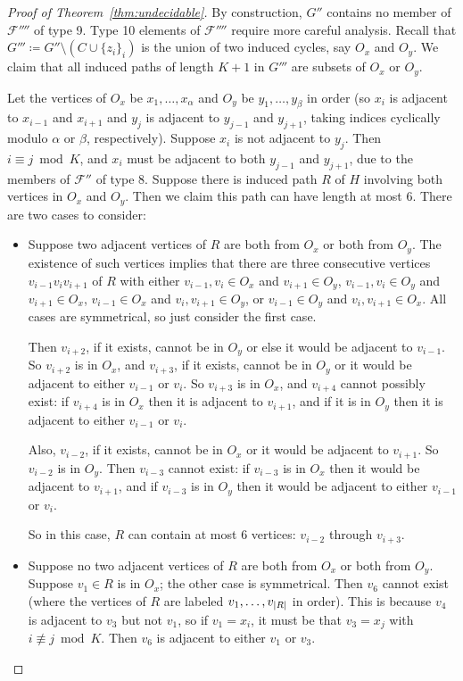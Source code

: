 \documentclass{article}
\newcommand{\Fc}{\mathcal{F}}
\DeclarePairedDelimiter{\abs}{\lvert}{\rvert}
\begin{document}
\begin{proof}[Proof of Theorem~\ref{thm:undecidable}]
By construction, $G''$ contains no member of $\Fc''''$ of type 9. Type 10 elements of $\Fc''''$ require more careful analysis. Recall that $G'''\coloneq G''\setminus(C\cup\{z_i\}_i)$ is the union of two induced cycles, say $O_x$ and $O_y$. We claim that all induced paths of length $K+1$ in $G'''$ are subsets of $O_x$ or $O_y$.

Let the vertices of $O_x$ be $x_1,\dots, x_\alpha$ and $O_y$ be $y_1,\dots, y_\beta$ in order (so $x_i$ is adjacent to $x_{i-1}$ and $x_{i+1}$ and $y_j$ is adjacent to $y_{j-1}$ and $y_{j+1}$, taking indices cyclically modulo $\alpha$ or $\beta$, respectively). Suppose $x_i$ is not adjacent to $y_j$. Then $i\equiv j\bmod K$, and $x_i$ must be adjacent to both $y_{j-1}$ and $y_{j+1}$, due to the members of $\Fc''$ of type 8. Suppose there is induced path $R$ of $H$ involving both vertices in $O_x$ and $O_y$. Then we claim this path can have length at most 6. There are two cases to consider:
\begin{itemize}
    \item Suppose two adjacent vertices of $R$ are both from $O_x$ or both from $O_y$. The existence of such vertices implies that there are three consecutive vertices $v_{i-1}v_iv_{i+1}$ of $R$ with either $v_{i-1},v_i\in O_x$ and $v_{i+1}\in O_y$, $v_{i-1},v_i\in O_y$ and $v_{i+1}\in O_x$, $v_{i-1}\in O_x$ and $v_i,v_{i+1}\in O_y$, or $v_{i-1}\in O_y$ and $v_i,v_{i+1}\in O_x$. All cases are symmetrical, so just consider the first case.
    
    Then $v_{i+2}$, if it exists, cannot be in $O_y$ or else it would be adjacent to $v_{i-1}$. So $v_{i+2}$ is in $O_x$, and $v_{i+3}$, if it exists, cannot be in $O_y$ or it would be adjacent to either $v_{i-1}$ or $v_i$. So $v_{i+3}$ is in $O_x$, and $v_{i+4}$ cannot possibly exist: if $v_{i+4}$ is in $O_x$ then it is adjacent to $v_{i+1}$, and if it is in $O_y$ then it is adjacent to either $v_{i-1}$ or $v_i$.

    Also, $v_{i-2}$, if it exists, cannot be in $O_x$ or it would be adjacent to $v_{i+1}$. So $v_{i-2}$ is in $O_y$. Then $v_{i-3}$ cannot exist: if $v_{i-3}$ is in $O_x$ then it would be adjacent to $v_{i+1}$, and if $v_{i-3}$ is in $O_y$ then it would be adjacent to either $v_{i-1}$ or $v_i$.

    So in this case, $R$ can contain at most 6 vertices: $v_{i-2}$ through $v_{i+3}$.
    \item Suppose no two adjacent vertices of $R$ are both from $O_x$ or both from $O_y$. Suppose $v_1\in R$ is in $O_x$; the other case is symmetrical. Then $v_6$ cannot exist (where the vertices of $R$ are labeled $v_1,\dots,v_{\abs{R}}$ in order). This is because $v_4$ is adjacent to $v_3$ but not $v_1$, so if $v_1=x_i$, it must be that $v_3=x_j$ with $i\not\equiv j\bmod K$. Then $v_6$ is adjacent to either $v_1$ or $v_3$.


\end{itemize}
\end{proof}
\end{document}
